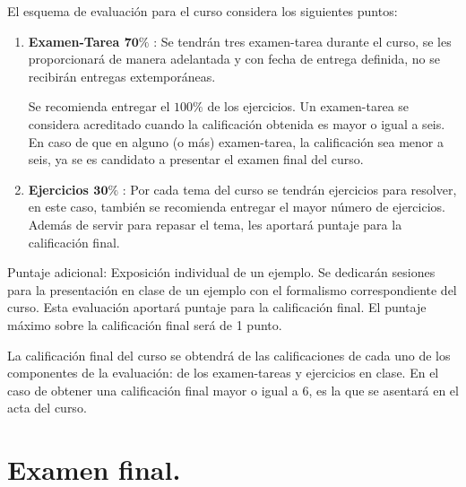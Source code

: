 El esquema de evaluación para el curso considera los siguientes puntos:
\begin{enumerate}[label=\alph*)]
\item \textbf{Examen-Tarea $\mathbf{70\%}$} : Se tendrán tres examen-tarea durante el curso, se les proporcionará de manera adelantada y con fecha de entrega definida, no se recibirán entregas extemporáneas. 
\par
Se recomienda entregar el $100\%$ de los ejercicios. Un examen-tarea se considera acreditado cuando la calificación obtenida es mayor o igual a seis. En caso de que en alguno (o más) examen-tarea, la calificación sea menor a seis, ya se es candidato a presentar el examen final del curso.
\item \textbf{Ejercicios $\mathbf{30\%}$} : Por cada tema del curso se tendrán ejercicios para resolver, en este caso, también se recomienda entregar el mayor número de ejercicios. Además de servir para repasar el tema, les aportará puntaje para la calificación final.
\end{enumerate}

Puntaje adicional: Exposición individual de un ejemplo. Se dedicarán sesiones para la presentación en clase de un ejemplo con el formalismo correspondiente del curso. Esta evaluación aportará puntaje para la calificación final. El puntaje máximo sobre la calificación final será de 1 punto.

La calificación final del curso se obtendrá de las calificaciones de cada uno de los componentes de la evaluación: de los examen-tareas y ejercicios en clase. En el caso de obtener una calificación final mayor o igual a $6$, es la que se asentará en el acta del curso.

\section{Examen final.}


